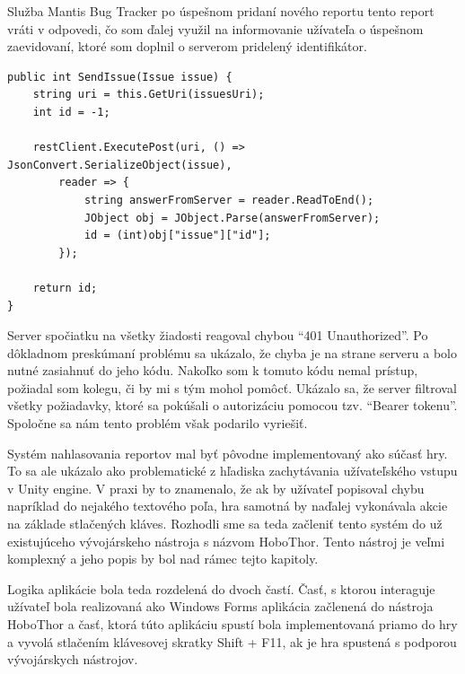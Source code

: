 \documentclass[slovak, bachelorpractice]{diploma}
\begin{document}
Služba Mantis Bug Tracker po úspešnom pridaní nového reportu tento report vráti v odpovedi, čo som ďalej využil na informovanie užívateľa o úspešnom zaevidovaní, ktoré som doplnil o serverom pridelený identifikátor.
\vspace{10pt}
\begin{lstlisting}[label=src:SendIssue,caption={Metóda SendIssue triedy MantisClient}]
public int SendIssue(Issue issue) {
	string uri = this.GetUri(issuesUri);
	int id = -1;

	restClient.ExecutePost(uri, () => JsonConvert.SerializeObject(issue),
        reader => {
            string answerFromServer = reader.ReadToEnd();
            JObject obj = JObject.Parse(answerFromServer);
            id = (int)obj["issue"]["id"];
        });

    return id;
}
\end{lstlisting}
Server spočiatku na všetky žiadosti reagoval chybou \enquote{401 Unauthorized}. Po dôkladnom preskúmaní problému sa ukázalo, že chyba je na strane serveru a bolo nutné zasiahnuť do jeho kódu. Nakoľko som k tomuto kódu nemal prístup, požiadal som kolegu, či by mi s tým mohol pomôcť. Ukázalo sa, že server filtroval všetky požiadavky, ktoré sa pokúšali o autorizáciu pomocou tzv. \enquote{Bearer tokenu}. Spoločne sa nám tento problém však podarilo vyriešiť. 

Systém nahlasovania reportov mal byť pôvodne implementovaný ako súčasť hry. To sa ale ukázalo ako problematické z hľadiska zachytávania užívateľského vstupu v Unity engine. V praxi by to znamenalo, že ak by užívateľ popisoval chybu napríklad do nejakého textového poľa, hra samotná by naďalej vykonávala akcie na základe stlačených kláves. Rozhodli sme sa teda začleniť tento systém do už existujúceho vývojárskeho nástroja s názvom HoboThor. Tento nástroj je veľmi komplexný a jeho popis by bol nad rámec tejto kapitoly.

Logika aplikácie bola teda rozdelená do dvoch častí. Časť, s ktorou interaguje užívateľ bola realizovaná ako Windows Forms aplikácia začlenená do nástroja HoboThor a časť, ktorá túto aplikáciu spustí bola implementovaná priamo do hry a vyvolá stlačením klávesovej skratky Shift + F11, ak je hra spustená s podporou vývojárskych nástrojov. 
\end{document}
